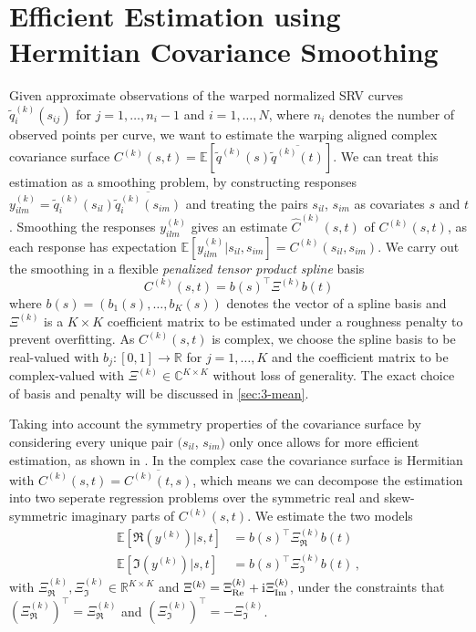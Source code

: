 \section{Efficient Estimation using Hermitian Covariance Smoothing}
\label{sec:3-cov}
Given approximate observations of the warped normalized SRV curves $\widetilde q^{(k)}_i(s_{ij})$ for $j = 1,\dots,n_i-1$ and $i=1,\dots,N$, where $n_i$ denotes the number of observed points per curve, we want to estimate the warping aligned complex covariance surface $C^{(k)}(s,t) = \mathbb{E}[\widetilde q^{(k)}(s)\overline{\widetilde q^{(k)}(t)}]$.
We can treat this estimation as a smoothing problem, by constructing responses $y^{(k)}_{ilm} = \widetilde q^{(k)}_i(s_{il}) \overline{\widetilde q^{(k)}_i(s_{im})}$ and treating the pairs $s_{il}$, $s_{im}$ as covariates $s$ and $t$.
Smoothing the responses $y^{(k)}_{ilm}$ gives an estimate $\hat C^{(k)}(s,t)$ of $C^{(k)}(s,t)$, as each response has expectation $\mathbb{E}[y^{(k)}_{ilm}|s_{il},s_{im}] = C^{(k)}(s_{il},s_{im})$. 
We carry out the smoothing in a flexible \emph{penalized tensor product spline} basis 
\begin{equation}
  C^{(k)}(s,t) = b(s)^\top \Xi^{(k)} b(t) 
\end{equation}
where $b(s) = (b_1(s),\dots,b_K(s))$ denotes the vector of a spline basis and $\Xi^{(k)}$ is a $K \times K$ coefficient matrix to be estimated under a roughness penalty to prevent overfitting. 
As $C^{(k)}(s,t)$ is complex, we choose the spline basis to be real-valued with $b_j : [0,1] \rightarrow \mathbb{R}$ for $j = 1,\dots,K$ and the coefficient matrix to be complex-valued with $\Xi^{(k)} \in \mathbb{C}^{K \times K}$ without loss of generality.
The exact choice of basis and penalty will be discussed in \cref{sec:3-mean}.

Taking into account the symmetry properties of the covariance surface by considering every unique pair $(s_{il}$, $s_{im})$ only once allows for more efficient estimation, as shown in \cite{CederbaumScheiplGreven2018}. 
In the complex case the covariance surface is Hermitian with $C^{(k)}(s,t) = \overline{C^{(k)}(t,s)}$, which means we can decompose the estimation into two seperate regression problems over the symmetric real and skew-symmetric imaginary parts of $C^{(k)}(s,t)$.
We estimate the two models
\begin{align}
  \mathbb{E}[\Re(y^{(k)})|s,t] &= b(s)^\top \Xi^{(k)}_{\Re} b(t) \\
  \mathbb{E}[\Im(y^{(k)})|s,t] &= b(s)^\top \Xi^{(k)}_{\Im} b(t)\,,
\end{align}
with $\Xi^{(k)}_\Re, \Xi^{(k)}_\Im \in \mathbb{R}^{K\times K}$ and $\Xi^{(k)} = \Xi^{(k)}_{\mathrm{Re}} + \mathrm{i}\mkern1mu \Xi^{(k)}_{\mathrm{Im}}$, under the constraints that $(\Xi^{(k)}_\Re)^\top = \Xi^{(k)}_\Re$ and $(\Xi^{(k)}_\Im)^\top = - \Xi^{(k)}_\Im$.

